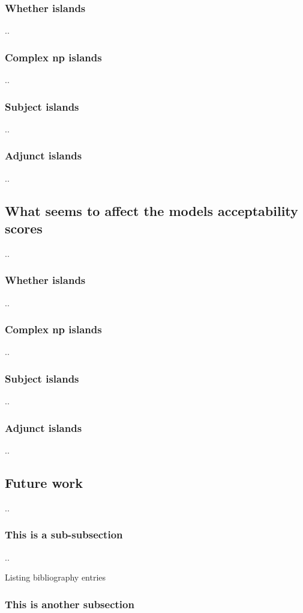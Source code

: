 \subsubsection{Whether islands}
..
\subsubsection{Complex np islands}
..
\subsubsection{Subject islands}
..
\subsubsection{Adjunct islands}
..

\subsection{What seems to affect the models acceptability scores}
..
\subsubsection{Whether islands}
..
\subsubsection{Complex np islands}
..
\subsubsection{Subject islands}
..
\subsubsection{Adjunct islands}
..

\subsection{Future work}
..

\subsubsection{This is a sub-subsection}
..



Listing bibliography entries \citep{wei2021frequency, hu2020systematic, lau2020furiously,  sprouse2016experimental}

\subsubsection{This is another subsection}

